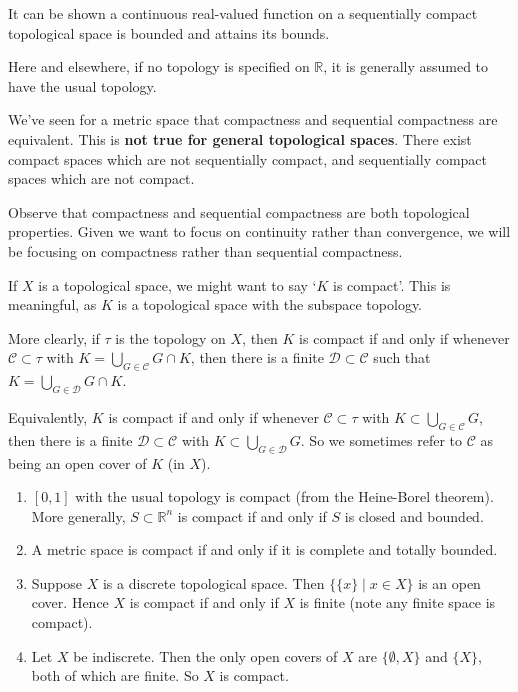 \documentclass[12pt]{article}
\begin{document}
It can be shown a continuous real-valued function on a sequentially compact topological space is bounded and attains its bounds.

\begin{remark}
	Here and elsewhere, if no topology is specified on $\mathbb{R}$, it is generally assumed to have the usual topology.
\end{remark}

We've seen for a metric space that compactness and sequential compactness are equivalent. This is \textbf{not true for general topological spaces}. There exist compact spaces which are not sequentially compact, and sequentially compact spaces which are not compact.

Observe that compactness and sequential compactness are both topological properties. Given we want to focus on continuity rather than convergence, we will be focusing on compactness rather than sequential compactness.

\begin{remark}
	If $X$ is a topological space, we might want to say `$K$ is compact'. This is meaningful, as $K$ is a topological space with the subspace topology.

	More clearly, if $\tau$ is the topology on $X$, then $K$ is compact if and only if whenever $\mathcal{C} \subset \tau$ with $K = \bigcup_{G \in \mathcal{C}}G \cap K$, then there is a finite $\mathcal{D} \subset \mathcal{C}$ such that $K = \bigcup_{G \in \mathcal{D}}G \cap K$.

	Equivalently, $K$ is compact if and only if whenever $\mathcal{C} \subset \tau$ with $K \subset \bigcup_{G \in \mathcal{C}} G$, then there is a finite $\mathcal{D} \subset \mathcal{C}$ with $K \subset \bigcup_{G \in \mathcal{D}}G$. So we sometimes refer to $\mathcal{C}$ as being an open cover of $K$ (in $X$).
\end{remark}

\begin{exbox}
	\begin{enumerate}[1.]
		\item $[0, 1]$ with the usual topology is compact (from the Heine-Borel theorem). More generally, $S \subset \mathbb{R}^{n}$ is compact if and only if $S$ is closed and bounded.
		\item A metric space is compact if and only if it is complete and totally bounded.
		\item Suppose $X$ is a discrete topological space. Then $\{\{x\} \mid x \in X\}$ is an open cover. Hence $X$ is compact if and only if $X$ is finite (note any finite space is compact).
		\item Let $X$ be indiscrete. Then the only open covers of $X$ are $\{\emptyset, X\}$ and $\{X\}$, both of which are finite. So $X$ is compact.
	\end{enumerate}
\end{exbox}
\end{document}
